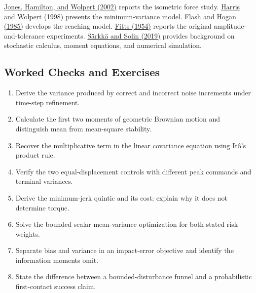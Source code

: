 \href{https://wolpertlab.neuroscience.columbia.edu/sites/default/files/content/papers/JonHamWol02.pdf}{Jones, Hamilton, and Wolpert (2002)} reports the isometric force study.
\href{https://wolpertlab.neuroscience.columbia.edu/sites/default/files/content/papers/HarWol98.pdf}{Harris and Wolpert (1998)} presents the minimum-variance model.
\href{https://pubmed.ncbi.nlm.nih.gov/4020415/}{Flash and Hogan (1985)} develops the reaching model.
\href{https://doi.org/10.1037/h0055392}{Fitts (1954)} reports the original amplitude-and-tolerance experiments.
\href{https://users.aalto.fi/~ssarkka/pub/sde_book.pdf}{Särkkä and Solin (2019)} provides background on stochastic calculus, moment equations, and numerical simulation.

\begin{samepage}
\section{Worked Checks and Exercises}

\begin{enumerate}[itemsep=0.25em,parsep=0pt]
\item Derive the variance produced by correct and incorrect noise increments under time-step refinement.
\item Calculate the first two moments of geometric Brownian motion and distinguish mean from mean-square stability.
\item Recover the multiplicative term in the linear covariance equation using Itô's product rule.
\item Verify the two equal-displacement controls with different peak commands and terminal variances.
\item Derive the minimum-jerk quintic and its cost; explain why it does not determine torque.
\item Solve the bounded scalar mean-variance optimization for both stated risk weights.
\item Separate bias and variance in an impact-error objective and identify the information moments omit.
\item State the difference between a bounded-disturbance funnel and a probabilistic first-contact success claim.
\end{enumerate}
\end{samepage}
